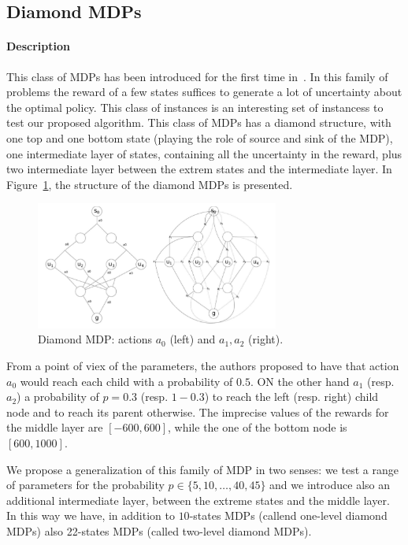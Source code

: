   




\subsection{Diamond MDPs}
\paragraph{Description}
This class of MDPs has been introduced for the first time in~\cite{benavent2018}. 
In this family of problems the reward of a few states suffices to generate a lot of uncertainty about the optimal policy. This class of instances is an interesting set of instancess to test our proposed algorithm.
This class of MDPs has a diamond structure, with one top and one bottom state (playing the role of source and sink of the  MDP), one intermediate layer of states, containing all the uncertainty in the reward, plus two intermediate layer between the extrem states and the intermediate layer.
In Figure~\ref{fig:diamond}, the structure of the diamond MDPs is presented.

\begin{figure}[h]
\begin{center}
\includegraphics[width=8cm]{images/diamond.png}
\end{center}
\caption{Diamond MDP: actions $a_0$ (left) and $a_1, a_2$ (right).}
\label{fig:diamond}
\end{figure}

From a point of viex of the parameters, the authors proposed to have that action $a_0$ would reach each child with a probability of $0.5$. ON the other hand $a_1$ (resp. $a_2$) a probability of $p= 0.3$ (resp. $1-0.3$) to reach the left (resp. right) child node and to reach its parent otherwise.
The imprecise values of the rewards for the middle layer are $[-600,600]$, while the one of the bottom node is $[600,1000]$.

We propose a generalization of this family of MDP in two senses: we test a range of parameters for the probability $p \in \{5,10,\dots,40,45\}$ and we introduce also an additional intermediate layer, between the extreme states and the middle layer. In this way we have, in addition to $10$-states MDPs (callend one-level diamond MDPs) also  22-states MDPs (called two-level diamond MDPs). 

